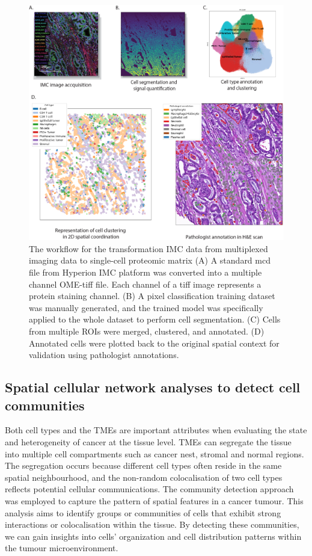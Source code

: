 \begin{figure}[htp]
    \centering
    \includegraphics[width=\columnwidth]{Chapter3/Figures/Chapter3_Figure2_IMC_cellID_ver2.png}
    \caption[Cell identification from Hyperion Imaging Mass Cytometry data]{The workflow for the transformation IMC data from multiplexed imaging data to single-cell proteomic matrix (A) A standard mcd file from Hyperion IMC platform was converted into a multiple channel OME-tiff file. Each channel of a tiff image represents a protein staining channel. (B) A pixel classification training dataset was manually generated, and the trained model was specifically applied to the whole dataset to perform cell segmentation. (C) Cells from multiple ROIs were merged, clustered, and annotated. (D) Annotated cells were plotted back to the original spatial context for validation using pathologist annotations.}
    \label{Chap3:fig:IMC_cell_type_annotation}
\end{figure}
\subsection{Spatial cellular network analyses to detect cell communities}
\label{Chap:3:Community_detection_Method}
Both cell types and the TMEs are important attributes when evaluating the state and heterogeneity of cancer at the tissue level. TMEs can segregate the tissue into multiple cell compartments such as cancer nest, stromal and normal regions. The segregation occurs because different cell types often reside in the same spatial neighbourhood, and the non-random colocalisation of two cell types reflects potential cellular communications. The community detection approach was employed to capture the pattern of spatial features in a cancer tumour. This analysis aims to identify groups or communities of cells that exhibit strong interactions or colocalisation within the tissue. By detecting these communities, we can gain insights into cells' organization and cell distribution patterns within the tumour microenvironment. 

